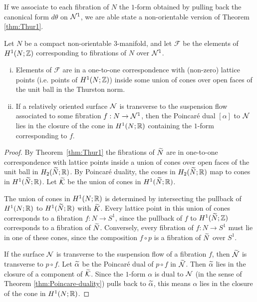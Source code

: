 If we associate to each fibration of $N$ the $1$-form obtained by pulling back the canonical form $d\theta$ on $\mathcal{N}^1$, we are able state a non-orientable version of Theorem \ref{thm:Thur1}.
\begin{thm}
  \label{thm:classifying-fibrations}
  Let $N$ be a compact non-orientable $3$-manifold, and let $\mathcal{F}$ be the elements of $H^1(N; \mathbb{Z})$ corresponding to fibrations of $N$ over $\mathcal{N}^1$.
  \begin{enumerate}[(i)]
  \item Elements of $\mathcal{F}$ are in a one-to-one correspondence with (non-zero) lattice points (i.e. points of $H^1(N; \mathbb{Z})$) inside some union of cones over open faces of the unit ball in the Thurston norm.
  \item If a relatively oriented surface $\mathcal{N}$ is transverse to the suspension flow associated to some fibration $f: N \to \mathcal{N}^1$, then the Poincar\'e dual $[\alpha]$ to $\mathcal{N}$ lies in the closure of the cone in $H^1(N; \mathbb{R})$ containing the $1$-form corresponding to $f$.
  \end{enumerate}
\end{thm}
\begin{proof}
By Theorem~\ref{thm:Thur1} the fibrations of $\widetilde{N}$ are in one-to-one correspondence with lattice points inside a union of cones over open faces of the unit ball in $H_2(\widetilde{N};\mathbb{R})$.  By Poincar\'e duality, the cones in $H_2(\widetilde{N};\mathbb{R})$ map to cones in $H^1(\widetilde{N};\mathbb{R})$.  Let $\widetilde{\mathcal{K}}$ be the union of cones in $H^1(\widetilde{N};\mathbb{R})$.

  The union of cones in $H^1(N; \mathbb{R})$ is determined by intersecting the pullback of $H^1(N; \mathbb{R})$ to $H^1(\widetilde{N}; \mathbb{R})$ with $\widetilde{K}$.
  Every lattice point in this union of cones corresponds to a fibration $f:N\to S^1$, since the pullback of $f$ to $H^1(\widetilde{N}; \mathbb{Z})$ corresponds to a fibration of $\widetilde{N}$.
  Conversely, every fibration of $f:N\rightarrow S^1$ must lie in one of these cones, since the composition $f\circ p$ is a fibration of $\widetilde{N}$ over $S^1$.

  If the surface $\mathcal{N}$ is transverse to the suspension flow of a fibration $f$, then $\widetilde{\mathcal{N}}$ is transverse to $p \circ f$.  Let $\widetilde{\alpha}$ be the Poincar\'e dual of $p\circ f$ in $\widetilde{\mathcal{N}}$.  Then $\widetilde{\alpha}$ lies in the closure of a component of $\widetilde{\mathcal{K}}$.
  Since the $1$-form $\alpha$ is dual to $\mathcal{N}$ (in the sense of Theorem \ref{thm:Poincare-duality}) pulls back to $\widetilde{\alpha}$, this means $\alpha$ lies in the closure of the cone in $H^1(N; \mathbb{R})$.
\end{proof}

